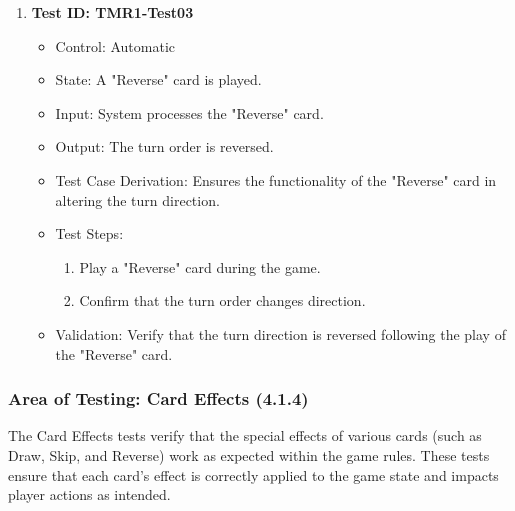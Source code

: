 \documentclass[12pt, titlepage]{article}
\begin{document}
\begin{enumerate}
    \item \textbf{Test ID: TMR1-Test03}
        \begin{itemize}
            \item Control: Automatic
            \item State: A "Reverse" card is played.
            \item Input: System processes the "Reverse" card.
            \item Output: The turn order is reversed.
            \item Test Case Derivation: Ensures the functionality of the "Reverse" card in altering the turn direction.
            \item Test Steps:
                \begin{enumerate}
                    \item Play a "Reverse" card during the game.
                    \item Confirm that the turn order changes direction.
                \end{enumerate}
            \item Validation: Verify that the turn direction is reversed following the play of the "Reverse" card.
        \end{itemize}
\end{enumerate}

\subsubsection{Area of Testing: Card Effects (4.1.4)}

The Card Effects tests verify that the special effects of various cards (such as Draw, Skip, and Reverse) work as expected within the game rules. These tests ensure that each card’s effect is correctly applied to the game state and impacts player actions as intended.
\end{document}
